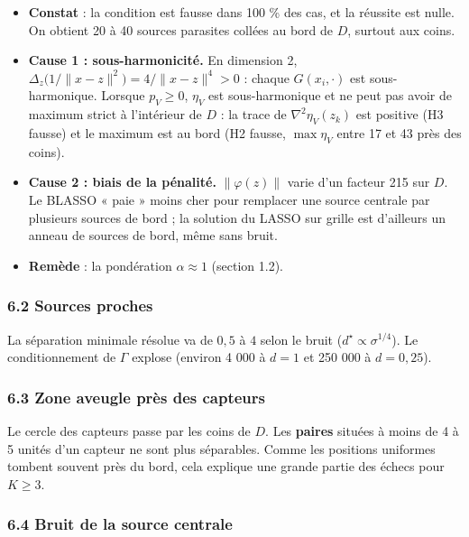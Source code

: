 \documentclass[
  french,
]{article}
\providecommand{\tightlist}{%
  \setlength{\itemsep}{0pt}\setlength{\parskip}{0pt}}
\begin{document}
\begin{itemize}
\tightlist
\item
  \textbf{Constat} : la condition est fausse dans 100 \% des cas, et la
  réussite est nulle. On obtient 20 à 40 sources parasites collées au
  bord de \(D\), surtout aux coins.
\item
  \textbf{Cause 1 : sous-harmonicité.} En dimension 2,
  \(\Delta_z\big(1/\lVert x-z\rVert^2\big) = 4/\lVert x-z\rVert^4 > 0\)
  : chaque \(G(x_i,\cdot)\) est sous-harmonique. Lorsque \(p_V\ge 0\),
  \(\eta_V\) est sous-harmonique et ne peut pas avoir de maximum strict
  à l'intérieur de \(D\) : la trace de \(\nabla^2\eta_V(z_k)\) est
  positive (H3 fausse) et le maximum est au bord (H2 fausse,
  \(\max\eta_V\) entre 17 et 43 près des coins).
\item
  \textbf{Cause 2 : biais de la pénalité.} \(\lVert\varphi(z)\rVert\)
  varie d'un facteur 215 sur \(D\). Le BLASSO « paie » moins cher pour
  remplacer une source centrale par plusieurs sources de bord ; la
  solution du LASSO sur grille est d'ailleurs un anneau de sources de
  bord, même sans bruit.
\item
  \textbf{Remède} : la pondération \(\alpha\approx 1\) (section 1.2).
\end{itemize}

\subsubsection{6.2 Sources proches}\label{sources-proches}

La séparation minimale résolue va de \(0{,}5\) à \(4\) selon le bruit
(\(d^{\star}\propto\sigma^{1/4}\)). Le conditionnement de \(\Gamma\)
explose (environ 4 000 à \(d = 1\) et 250 000 à \(d = 0{,}25\)).

\subsubsection{6.3 Zone aveugle près des
capteurs}\label{zone-aveugle-pruxe8s-des-capteurs}

Le cercle des capteurs passe par les coins de \(D\). Les \textbf{paires}
situées à moins de 4 à 5 unités d'un capteur ne sont plus séparables.
Comme les positions uniformes tombent souvent près du bord, cela
explique une grande partie des échecs pour \(K\ge 3\).

\subsubsection{6.4 Bruit de la source
centrale}\label{bruit-de-la-source-centrale}
\end{document}
